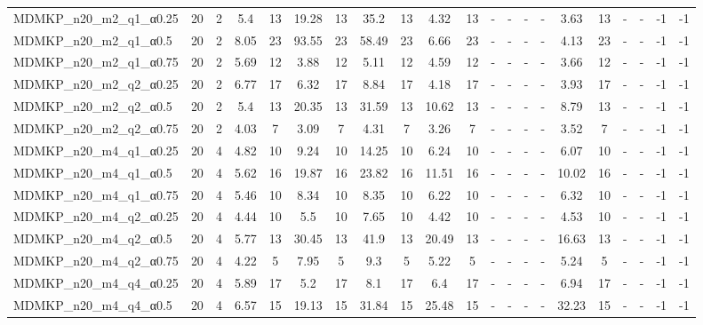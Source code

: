 \begin{sidewaystable}[!ht]
{\begin{tabular}{lcccccccccccccccccccc}
MDMKP\_n20\_m2\_q1\_α0.25 & 20 & 2 & 5.4 & 13 & 19.28 & 13 & 35.2 & 13 & 4.32 & 13 &  - &  - &  - &  - &  \textcolor{blue2}{3.63} & 13 &  - &  - & -1 & -1 \\
MDMKP\_n20\_m2\_q1\_α0.5 & 20 & 2 & 8.05 & 23 & 93.55 & 23 & 58.49 & 23 & 6.66 & 23 &  - &  - &  - &  - &  \textcolor{blue2}{4.13} & 23 &  - &  - & -1 & -1 \\
MDMKP\_n20\_m2\_q1\_α0.75 & 20 & 2 & 5.69 & 12 & 3.88 & 12 & 5.11 & 12 & 4.59 & 12 &  - &  - &  - &  - &  \textcolor{blue2}{3.66} & 12 &  - &  - & -1 & -1 \\
MDMKP\_n20\_m2\_q2\_α0.25 & 20 & 2 & 6.77 & 17 & 6.32 & 17 & 8.84 & 17 & 4.18 & 17 &  - &  - &  - &  - &  \textcolor{blue2}{3.93} & 17 &  - &  - & -1 & -1 \\
MDMKP\_n20\_m2\_q2\_α0.5 & 20 & 2 &  \textcolor{blue2}{5.4} & 13 & 20.35 & 13 & 31.59 & 13 & 10.62 & 13 &  - &  - &  - &  - & 8.79 & 13 &  - &  - & -1 & -1 \\
MDMKP\_n20\_m2\_q2\_α0.75 & 20 & 2 & 4.03 & 7 &  \textcolor{blue2}{3.09} & 7 & 4.31 & 7 & 3.26 & 7 &  - &  - &  - &  - & 3.52 & 7 &  - &  - & -1 & -1 \\
MDMKP\_n20\_m4\_q1\_α0.25 & 20 & 4 &  \textcolor{blue2}{4.82} & 10 & 9.24 & 10 & 14.25 & 10 & 6.24 & 10 &  - &  - &  - &  - & 6.07 & 10 &  - &  - & -1 & -1 \\
MDMKP\_n20\_m4\_q1\_α0.5 & 20 & 4 &  \textcolor{blue2}{5.62} & 16 & 19.87 & 16 & 23.82 & 16 & 11.51 & 16 &  - &  - &  - &  - & 10.02 & 16 &  - &  - & -1 & -1 \\
MDMKP\_n20\_m4\_q1\_α0.75 & 20 & 4 &  \textcolor{blue2}{5.46} & 10 & 8.34 & 10 & 8.35 & 10 & 6.22 & 10 &  - &  - &  - &  - & 6.32 & 10 &  - &  - & -1 & -1 \\
MDMKP\_n20\_m4\_q2\_α0.25 & 20 & 4 & 4.44 & 10 & 5.5 & 10 & 7.65 & 10 &  \textcolor{blue2}{4.42} & 10 &  - &  - &  - &  - & 4.53 & 10 &  - &  - & -1 & -1 \\
MDMKP\_n20\_m4\_q2\_α0.5 & 20 & 4 &  \textcolor{blue2}{5.77} & 13 & 30.45 & 13 & 41.9 & 13 & 20.49 & 13 &  - &  - &  - &  - & 16.63 & 13 &  - &  - & -1 & -1 \\
MDMKP\_n20\_m4\_q2\_α0.75 & 20 & 4 &  \textcolor{blue2}{4.22} & 5 & 7.95 & 5 & 9.3 & 5 & 5.22 & 5 &  - &  - &  - &  - & 5.24 & 5 &  - &  - & -1 & -1 \\
MDMKP\_n20\_m4\_q4\_α0.25 & 20 & 4 & 5.89 & 17 &  \textcolor{blue2}{5.2} & 17 & 8.1 & 17 & 6.4 & 17 &  - &  - &  - &  - & 6.94 & 17 &  - &  - & -1 & -1 \\
MDMKP\_n20\_m4\_q4\_α0.5 & 20 & 4 &  \textcolor{blue2}{6.57} & 15 & 19.13 & 15 & 31.84 & 15 & 25.48 & 15 &  - &  - &  - &  - & 32.23 & 15 &  - &  - & -1 & -1 \\

\end{tabular}}
\end{sidewaystable}
